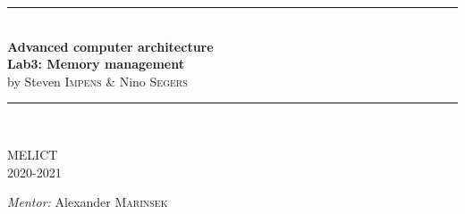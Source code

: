 \begin{titlepage}
\begin{center}

\rule{\linewidth}{1.5pt}\\[0.4cm]
{ \LARGE \bfseries Advanced computer architecture}\\[0.4cm]
{ \LARGE \bfseries Lab3: Memory management}\\[0.4cm]
{by Steven \textsc{Impens} \& Nino \textsc{Segers}}\\[0.2cm]
\rule{\linewidth}{1.5pt}\\[1.5cm]

\vfill

\begin{minipage}{0.49\textwidth}
\begin{flushleft} \large
MELICT\\
2020-2021\\
\end{flushleft}
\end{minipage}
\begin{minipage}{0.49\textwidth}
\begin{flushright} \large
\emph{Mentor:}
Alexander \textsc{Marinsek}\\
\end{flushright}
\end{minipage}

\end{center}
\end{titlepage}

